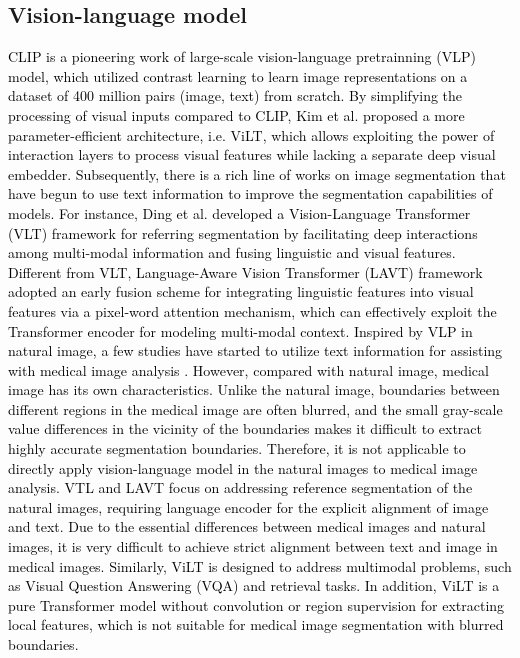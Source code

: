 \documentclass[lettersize,journal]{IEEEtran}
\begin{document}
\subsection{Vision-language model}
\textcolor{black}{
CLIP \cite{27radford2021learning} is a pioneering work of large-scale vision-language pretrainning (VLP) model, which utilized  contrast learning to learn image representations on a dataset of 400 million pairs (image, text) from scratch.  
By simplifying the processing of visual inputs compared to CLIP, Kim et al. \cite{28kim2021vilt} proposed  a more parameter-efficient architecture, i.e. ViLT, which allows exploiting the power of interaction layers to process visual features while lacking a separate deep visual embedder.
Subsequently, there is a rich line of works on image segmentation \cite{Yang22CVPR,31ding2021vision,Ding22PAMI,32yin2022devil,33xu2022groupvit,li2021gt} that have begun to use text information to improve the segmentation capabilities of models. 
For instance, Ding et al. \cite{Ding22PAMI} developed a Vision-Language Transformer (VLT) framework for referring segmentation by facilitating deep interactions among multi-modal information and fusing linguistic and visual features.  Different from VLT,  Language-Aware Vision Transformer (LAVT) \cite{Yang22CVPR} framework adopted an early fusion scheme for integrating linguistic features into visual features via a pixel-word attention mechanism, which can effectively exploit the Transformer encoder for modeling multi-modal context.
Inspired by VLP in natural image, a few studies have started to utilize text information for assisting with medical image analysis \cite{60bhalodia2021improving, 62muller2021joint,tomar2022tganet}. 
However, compared with natural image, medical image has its own characteristics. 
Unlike the natural image, boundaries between different regions in the medical image are often blurred, and the small gray-scale value differences in the vicinity of the boundaries makes it difficult to extract highly accurate segmentation boundaries. Therefore, it is not applicable to directly apply vision-language model in the natural images to medical image analysis.
VTL and LAVT focus on addressing reference segmentation of the natural images, requiring language encoder for the explicit alignment of image and text. Due to the essential differences between medical images and natural images, it is very difficult to achieve strict alignment between text and image in medical images.
Similarly, ViLT is designed to address multimodal problems, such as Visual Question Answering (VQA) and retrieval tasks. In addition, ViLT is a pure Transformer model without convolution or region supervision for extracting local features, which is not suitable for medical image segmentation with blurred boundaries.
}
\end{document}
